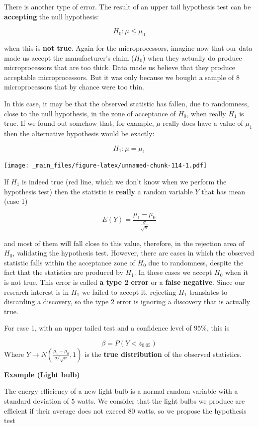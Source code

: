 \documentclass[
]{book}
\begin{document}
There is another type of error. The result of an upper tail hypothesis test can be \textbf{accepting} the null hypothesis:

\[H_0: \mu\leq\mu_0\]

when this is \textbf{not true}. Again for the microprocessors, imagine now that our data made us accept the manufacturer's claim (\(H_0\)) when they actually do produce microprocessors that are too thick. Data made us believe that they produce acceptable microprocessors. But it was only because we bought a sample of \(8\) microprocessors that by chance were too thin.

In this case, it may be that the observed statistic has fallen, due to randomness, close to the null hypothesis, in the zone of acceptance of \(H_0\), when really \(H_1\) is true. If we found out somehow that, for example, \(\mu\) really does have a value of \(\mu_1\) then the alternative hypothesis would be exactly:

\[H_1: \mu=\mu_1\]

\texttt{[image: \_main\_files/figure-latex/unnamed-chunk-114-1.pdf]}

If \(H_1\) is indeed true (red line, which we don't know when we perform the hypothesis test) then the statistic is \textbf{really} a random variable \(Y\) that has mean (case 1)

\[E(Y)=\frac{\mu_1-\mu_0}{\frac{\sigma}{\sqrt{n}}}\]

and most of them will fall close to this value, therefore, in the rejection area of \(H_0\), validating the hypothesis test. However, there are cases in which the observed statistic falls within the acceptance zone of \(H_0\) due to randomness, despite the fact that the statistics are produced by \(H_1\). In these cases we accept \(H_0\) when it is not true. This error is called \textbf{a type 2 error} or a \textbf{false negative}. Since our research interest is in \(H_1\) we failed to accept it. rejecting \(H_1\) translates to discarding a discovery, so the type 2 error is ignoring a discovery that is actually true.

For case 1, with an upper tailed test and a confidence level of \(95\%\), this is

\[\beta= P(Y < z_{0.05})\]
Where \(Y \rightarrow N(\frac{\mu_1-\mu_0}{\sigma/\sqrt{n}},1)\) is the \textbf{true distribution} of the observed statistics.

\textbf{Example (Light bulb)}

The energy efficiency of a new light bulb is a normal random variable with a standard deviation of \(5\) watts. We consider that the light bulbs we produce are efficient if their average does not exceed \(80\) watts, so we propose the hypothesis test
\end{document}

